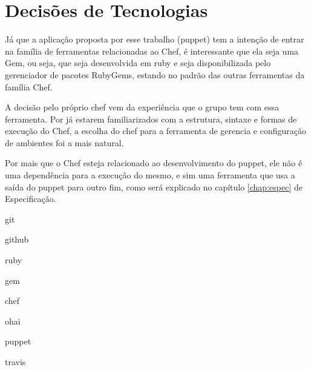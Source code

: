 \section{Decisões de Tecnologias}

Já que a aplicação proposta por esse trabalho (puppet) tem a intenção de entrar na família de ferramentas relacionadas ao Chef, é interessante que ela seja uma Gem, ou seja, que seja desenvolvida em ruby e seja disponibilizada pelo gerenciador de pacotes RubyGems, estando no padrão das outras ferramentas da família Chef.

A decisão pelo próprio chef vem da experiência que o grupo tem com essa ferramenta. Por já estarem familiarizados com a estrutura, sintaxe e formas de execução do Chef, a escolha do chef para a ferramenta de gerencia e configuração de ambientes foi a mais natural.

Por mais que o Chef esteja relacionado ao desenvolvimento do puppet, ele não é uma dependência para a execução do mesmo, e sim uma ferramenta que usa a saída do puppet para outro fim, como será explicado no capítulo \ref{chap:espec} de Especificação.

git

github

ruby

gem

chef

ohai

puppet

travis

